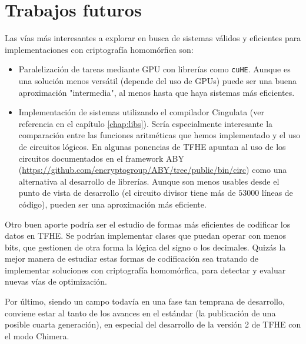 \chapter{Trabajos futuros}
\label{chap:trabajos_futuros}

Las vías más interesantes a explorar en busca de sistemas válidos y eficientes para implementaciones con criptografía homomórfica son:

\begin{itemize}
    \item Paralelización de tareas mediante GPU con librerías como \verb|cuHE|. Aunque es una solución menos versátil (depende del uso de GPUs) puede ser una buena aproximación "intermedia", al menos hasta que haya sistemas más eficientes. 
    \item Implementación de sistemas utilizando el compilador Cingulata (ver referencia en el capítulo \ref{chap:libs}). Sería especialmente interesante la comparación entre las funciones aritméticas que hemos implementado y el uso de circuitos lógicos. En algunas ponencias de TFHE apuntan al uso de los circuitos documentados en el framework ABY (\url{https://github.com/encryptogroup/ABY/tree/public/bin/circ}) como una alternativa al desarrollo de librerías. Aunque son menos usables desde el punto de vista de desarrollo (el circuito divisor tiene más de $53000$ líneas de código), pueden ser una aproximación más eficiente. 
\end{itemize}

Otro buen aporte podría ser el estudio de formas más eficientes de codificar los datos en TFHE. Se podrían implementar clases que puedan operar con menos bits, que gestionen de otra forma la lógica del signo o los decimales. Quizás la mejor manera de estudiar estas formas de codificación sea tratando de implementar soluciones con criptografía homomórfica, para detectar y evaluar nuevas vías de optimización.

Por último, siendo un campo todavía en una fase tan temprana de desarrollo, conviene estar al tanto de los avances en el estándar (la publicación de una posible cuarta generación), en especial del desarrollo de la versión 2 de TFHE con el modo Chimera.
